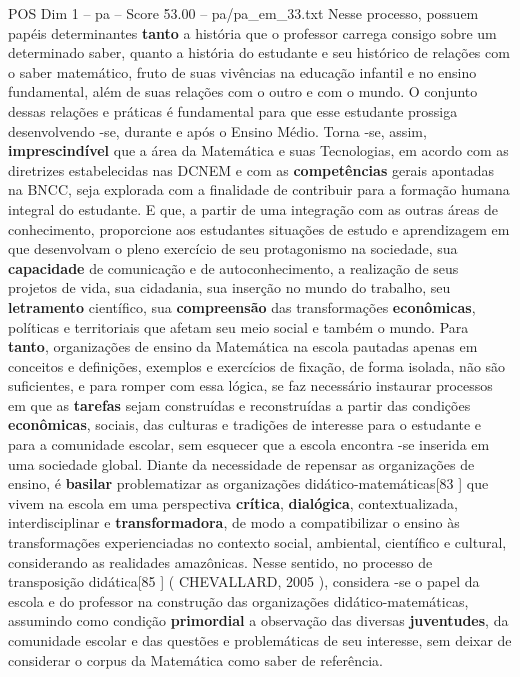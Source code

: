 \begin{textsample}{POS Dim 1 – pa – Score 53.00 – pa/pa\_em\_33.txt}  \label{ex:f1_pos_040}
Nesse processo, possuem papéis determinantes \textbf{tanto} a história que o professor carrega consigo sobre um determinado saber, quanto a história do estudante e seu histórico de relações com o saber matemático, fruto de suas vivências na educação infantil e no ensino fundamental, além de suas relações com o outro e com o mundo.
O conjunto dessas relações e práticas é fundamental para que esse estudante prossiga desenvolvendo -se, durante e após o Ensino Médio.
Torna -se, assim, \textbf{imprescindível} que a área da Matemática e suas Tecnologias, em acordo com as diretrizes estabelecidas nas DCNEM e com as \textbf{competências} gerais apontadas na BNCC, seja explorada com a finalidade de contribuir para a formação humana integral do estudante.
E que, a partir de uma integração com as outras áreas de conhecimento, proporcione aos estudantes situações de estudo e aprendizagem em que desenvolvam o pleno exercício de seu protagonismo na sociedade, sua \textbf{capacidade} de comunicação e de autoconhecimento, a realização de seus projetos de vida, sua cidadania, sua inserção no mundo do trabalho, seu \textbf{letramento} científico, sua \textbf{compreensão} das transformações \textbf{econômicas}, políticas e territoriais que afetam seu meio social e também o mundo.
Para \textbf{tanto}, organizações de ensino da Matemática na escola pautadas apenas em conceitos e definições, exemplos e exercícios de fixação, de forma isolada, não são suficientes, e para romper com essa lógica, se faz necessário instaurar processos em que as \textbf{tarefas} sejam construídas e reconstruídas a partir das condições \textbf{econômicas}, sociais, das culturas e tradições de interesse para o estudante e para a comunidade escolar, sem esquecer que a escola encontra -se inserida em uma sociedade global.
Diante da necessidade de repensar as organizações de ensino, é \textbf{basilar} problematizar as organizações didático-matemáticas[83 ] que vivem na escola em uma perspectiva \textbf{crítica}, \textbf{dialógica}, contextualizada, interdisciplinar e \textbf{transformadora}, de modo a compatibilizar o ensino às transformações experienciadas no contexto social, ambiental, científico e cultural, considerando as realidades amazônicas.
Nesse sentido, no processo de transposição didática[85 ] ( CHEVALLARD, 2005 ), considera -se o papel da escola e do professor na construção das organizações didático-matemáticas, assumindo como condição \textbf{primordial} a observação das diversas \textbf{juventudes}, da comunidade escolar e das questões e problemáticas de seu interesse, sem deixar de considerar o corpus da Matemática como saber de referência.

\end{textsample}
